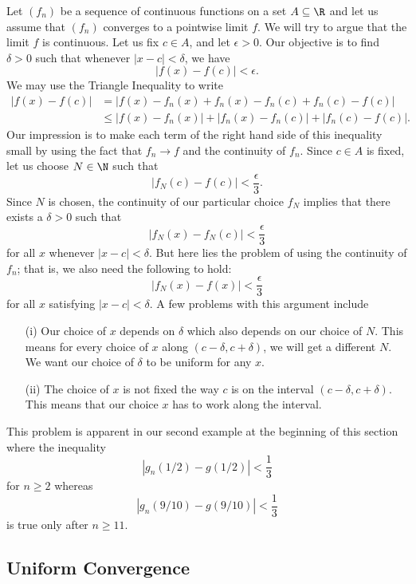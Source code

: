 Let \( (f_n)  \) be a sequence of continuous functions on a set \( A \subseteq \R  \) and let us assume that \( (f_n)  \) converges to a pointwise limit \( f  \). We will try to argue that the limit \( f  \) is continuous. Let us fix \( c \in A  \), and let \( \epsilon > 0  \). Our objective is to find  \( \delta > 0 \) such that whenever \( | x - c  | < \delta  \), we have 
\[  | f(x) - f(c) | < \epsilon. \]
We may use the Triangle Inequality to write
\begin{align*}
    | f(x) - f(c)  | &= | f(x) - f_n(x) + f_n(x) - f_n(c) + f_n(c) - f(c)   |  \\
                     &\leq | f(x) - f_n(x)  | + | f_n(x) - f_n(c)  | + | f_n(c) - f(c)  |.
\end{align*}
Our impression is to make each term of the right hand side of this inequality small by using the fact that \( f_n \to f  \) and the continuity of \( f_n  \).  Since \( c \in A  \) is fixed, let us choose \( N \in \N  \) such that 
\[  | f_N(c) - f(c)  | < \frac{ \epsilon  }{ 3 }. \]
Since \( N  \) is chosen, the continuity of our particular choice \( f_N  \) implies that there exists a \(  \delta > 0  \) such that 
\[  | f_N(x) - f_N(c)  | < \frac{ \epsilon  }{ 3 } \]
for all \( x  \) whenever \( | x - c  | < \delta  \). But here lies the problem of using the continuity of \( f_n  \); that is, we also need the following to hold:
\[  | f_N(x) - f(x)  | < \frac{ \epsilon  }{ 3 }  \] for all \( x  \) satisfying \( | x - c  | < \delta  \). A few problems with this argument include 
\begin{enumerate}
    \item[(i)] Our choice of \( x  \) depends on \( \delta  \) which also depends on our choice of \( N  \). This means for every choice of \( x  \) along \( (c - \delta, c + \delta ) \), we will get a different \( N  \). We want our choice of \( \delta  \) to be uniform for any \( x  \).
    \item[(ii)] The choice of \( x  \) is not fixed the way \( c  \) is on the interval \( (c - \delta, c + \delta ) \). This means that our choice \( x  \) has to work along the interval.
\end{enumerate}
This problem is apparent in our second example at the beginning of this section where the inequality
\[  | g_n(1/2 ) - g(1/2)  | < \frac{ 1 }{ 3 } \]
for \( n \geq 2  \) whereas 
\[  |g_n(9/10) - g(9/10)   | < \frac{ 1 }{ 3 }  \]
is true only after \( n \geq 11 \).

\subsection{Uniform Convergence} 


